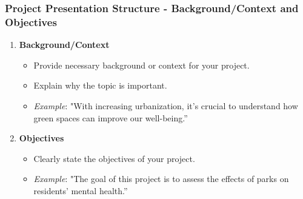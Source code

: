 \documentclass[aspectratio=169]{beamer}
\begin{document}
\begin{frame}[fragile]
    \frametitle{Project Presentation Structure - Background/Context and Objectives}
    \begin{enumerate}
        \item \textbf{Background/Context}
            \begin{itemize}
                \item Provide necessary background or context for your project.
                \item Explain why the topic is important.
                \item \textit{Example}: "With increasing urbanization, it's crucial to understand how green spaces can improve our well-being.”
            \end{itemize}
        
        \item \textbf{Objectives}
            \begin{itemize}
                \item Clearly state the objectives of your project.
                \item \textit{Example}: "The goal of this project is to assess the effects of parks on residents’ mental health.”
            \end{itemize}
    \end{enumerate}
\end{frame}
\end{document}
